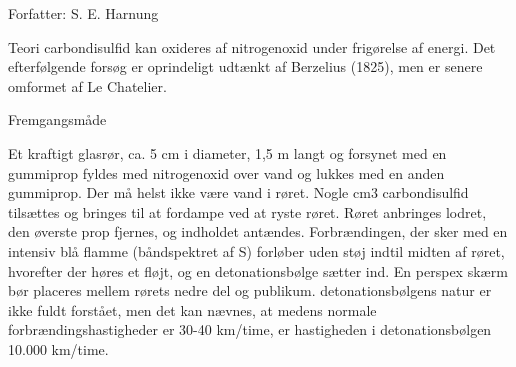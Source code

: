 



Forfatter: S. E. Harnung

Teori
carbondisulfid kan oxideres af nitrogenoxid under frigørelse af energi. Det
efterfølgende forsøg er oprindeligt udtænkt af Berzelius (1825), men er
senere omformet af Le Chatelier.

Fremgangsmåde

Et kraftigt glasrør, ca. 5 cm i diameter, 1,5 m langt og forsynet med en gummiprop
fyldes med nitrogenoxid over vand og lukkes med en anden gummiprop.
Der må helst ikke være vand i røret. Nogle cm3 carbondisulfid tilsættes og
bringes til at fordampe ved at ryste røret. Røret anbringes lodret, den
øverste prop fjernes, og indholdet antændes. Forbrændingen, der sker med
en intensiv blå flamme (båndspektret af S) forløber uden støj indtil midten af
røret, hvorefter der høres et fløjt, og en detonationsbølge sætter ind.
En perspex skærm bør placeres mellem rørets nedre del og publikum.
detonationsbølgens natur er ikke fuldt forstået, men det kan nævnes, at
medens normale forbrændingshastigheder er 30-40 km/time, er hastigheden i
detonationsbølgen 10.000 km/time.
